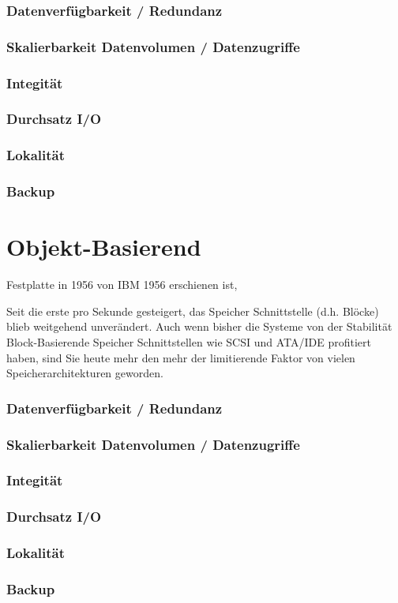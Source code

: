 \subsubsection{Datenverfügbarkeit / Redundanz}
\subsubsection{Skalierbarkeit Datenvolumen / Datenzugriffe}
\subsubsection{Integität}
\subsubsection{Durchsatz I/O}
\subsubsection{Lokalität}
\subsubsection{Backup}


\section{Objekt-Basierend}

Festplatte in 1956 von IBM 1956 erschienen ist, 


Seit die erste  pro Sekunde gesteigert, das Speicher Schnittstelle (d.h. Blöcke) blieb weitgehend unverändert. Auch wenn bisher die Systeme von der Stabilität  Block-Basierende Speicher Schnittstellen wie SCSI und ATA/IDE profitiert haben, sind Sie heute mehr den mehr der limitierende Faktor  von vielen Speicherarchitekturen geworden.
\subsubsection{Datenverfügbarkeit / Redundanz}
\subsubsection{Skalierbarkeit Datenvolumen / Datenzugriffe}
\subsubsection{Integität}
\subsubsection{Durchsatz I/O}
\subsubsection{Lokalität}
\subsubsection{Backup}
